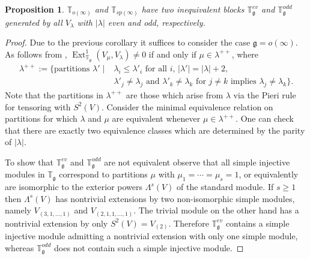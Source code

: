 \documentclass{amsart}
\newcommand{\so}{o}
\newcommand{\T}{\mathbb T}
\newcommand{\Tg}{\mathbb T_{\mathfrak g}}
\renewcommand{\gg}{\mathfrak{g}}
\newtheorem{prop}[thm]{Proposition}
\theoremstyle{definition}
\numberwithin{equation}{section}
\begin{document}
\begin{prop} $\T_{o(\infty)}$ and $\T_{sp(\infty)}$ have two
  inequivalent blocks  $\T_{\gg}^{ev}$ and  $\T_{\gg}^{odd}$
  generated by all $V_\lambda$ with $|\lambda|$ even and odd, respectively.
\end{prop}
\begin{proof} Due to the previous corollary it suffices to consider the
  case $\gg=\so(\infty)$. As follows from \cite{PStyr},
  $\operatorname{Ext}_{\Tg}^1(V_\mu,V_\lambda)\neq 0$ if and only if $\mu \in \lambda^{++}$, 
  where
\begin{align*}
\lambda^{++} := \{ \textrm{partitions } \lambda' \mid & \lambda_i \leq \lambda'_i \textrm{ for all }i  \textrm{, }
  |\lambda'| = |\lambda| + 2  \textrm{, } \\ 
 & \lambda'_j \neq \lambda_j \textrm{ and } \lambda'_k \neq \lambda_k \textrm{ for } j \neq k \textrm{ implies } \lambda_j \neq \lambda_k \}.
\end{align*} 
Note that the partitions in $ \lambda^{++}$ are those which arise from $\lambda$ via the Pieri rule for tensoring with $S^2(V)$.
Consider the minimal equivalence relation on
  partitions for which $\lambda$ and $\mu$ are equivalent whenever $\mu \in \lambda^{++}$. One can check that there are exactly two equivalence
  classes which are determined by the parity of $|\lambda|$. 

To show that $\T_{\gg}^{ev}$ and  $\T_{\gg}^{odd}$ are not
equivalent observe that  all simple injective modules in $\Tg$ correspond to
partitions $\mu$ with $\mu_1=\cdots=\mu_s=1$, or equivalently are isomorphic
to the exterior powers $\Lambda^s(V)$ of the standard module. If $s\geq 1$
then $\Lambda^s(V)$ has nontrivial extensions by two non-isomorphic simple modules, namely
$V_{(3,1, \ldots, 1)}$ and $V_{(2,1,1, \ldots, 1)}$.  The trivial module on the other hand has a nontrivial extension by only $S^2(V) = V_{(2)}$.  Therefore $\T_{\gg}^{ev}$ contains a simple injective module admitting a nontrivial extension with only one simple module, whereas $\T_{\gg}^{odd}$ does not contain such a simple injective module.
\end{proof}
\end{document}
